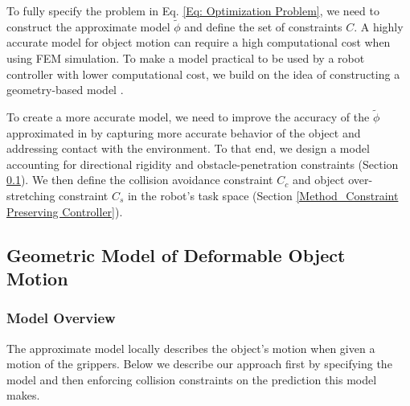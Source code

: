 To fully specify the problem in Eq. \ref{Eq: Optimization Problem}, we need to construct the approximate model $\tilde{\phi}$ and define the set of constraints $C$.  A highly accurate model for object motion can require a high computational cost when using FEM simulation. To make a model practical to be used by a robot controller with lower computational cost, we build on the idea of constructing a geometry-based model \cite{Berenson2013}. 

To create a more accurate model, we need to improve the accuracy of the $\tilde{\phi}$ approximated in \cite{Berenson2013} by capturing more accurate behavior of the object and addressing contact with the environment.
To that end, we design a model accounting for directional rigidity and obstacle-penetration constraints (Section \ref{Method_Jacobian-based Model of Deformable Object Motion}). We then define the collision avoidance constraint $C_c$ and object over-stretching constraint $C_s$ in the robot's task space (Section \ref{Method_Constraint Preserving Controller}).



\subsection{Geometric Model of Deformable Object Motion} \label{Method_Jacobian-based Model of Deformable Object Motion}

\subsubsection{Model Overview}
The approximate model locally describes the object's motion when given a motion of the grippers. Below we describe our approach first by specifying the model and then enforcing collision constraints on the prediction this model makes.

